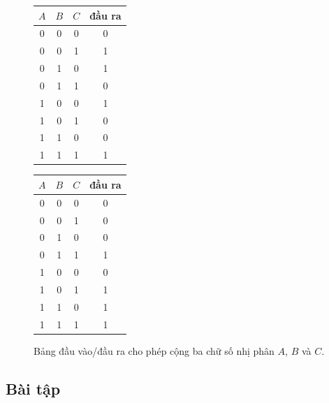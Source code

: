 \begin{figure}[h]
\centering
\begin{tabular}{ccc|c}
\hline
$A$ & $B$ & $C$ & đầu ra \\
\hline
0 & 0 & 0 & 0 \\
0 & 0 & 1 & 1 \\
0 & 1 & 0 & 1 \\
0 & 1 & 1 & 0 \\
1 & 0 & 0 & 1 \\
1 & 0 & 1 & 0 \\
1 & 1 & 0 & 0 \\
1 & 1 & 1 & 1 \\
\hline
\end{tabular}
\hspace{2cm}
\begin{tabular}{ccc|c}
\hline
$A$ & $B$ & $C$ & đầu ra \\
\hline
0 & 0 & 0 & 0 \\
0 & 0 & 1 & 0 \\
0 & 1 & 0 & 0 \\
0 & 1 & 1 & 1 \\
1 & 0 & 0 & 0 \\
1 & 0 & 1 & 1 \\
1 & 1 & 0 & 1 \\
1 & 1 & 1 & 1 \\
\hline
\end{tabular}
\caption{Bảng đầu vào/đầu ra cho phép cộng ba chữ số nhị phân $A$, $B$ và $C$.}
\label{fig:binary_add}
\end{figure}

\subsection*{Bài tập}

